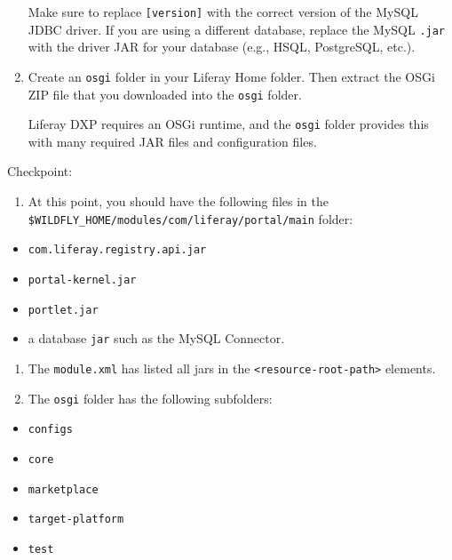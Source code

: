 \begin{enumerate}
  Make sure to replace \texttt{{[}version{]}} with the correct version
  of the MySQL JDBC driver. If you are using a different database,
  replace the MySQL \texttt{.jar} with the driver JAR for your database
  (e.g., HSQL, PostgreSQL, etc.).
\item
  Create an \texttt{osgi} folder in your Liferay Home folder. Then
  extract the OSGi ZIP file that you downloaded into the \texttt{osgi}
  folder.

  Liferay DXP requires an OSGi runtime, and the \texttt{osgi} folder
  provides this with many required JAR files and configuration files.
\end{enumerate}

Checkpoint:

\begin{enumerate}
\def\labelenumi{\arabic{enumi}.}
\tightlist
\item
  At this point, you should have the following files in the
  \texttt{\$WILDFLY\_HOME/modules/com/liferay/portal/main} folder:
\end{enumerate}

\begin{itemize}
\tightlist
\item
  \texttt{com.liferay.registry.api.jar}
\item
  \texttt{portal-kernel.jar}
\item
  \texttt{portlet.jar}
\item
  a database \texttt{jar} such as the MySQL Connector.
\end{itemize}

\begin{enumerate}
\def\labelenumi{\arabic{enumi}.}
\setcounter{enumi}{1}
\item
  The \texttt{module.xml} has listed all jars in the
  \texttt{\textless{}resource-root-path\textgreater{}} elements.
\item
  The \texttt{osgi} folder has the following subfolders:
\end{enumerate}

\begin{itemize}
\tightlist
\item
  \texttt{configs}
\item
  \texttt{core}
\item
  \texttt{marketplace}
\item
  \texttt{target-platform}
\item
  \texttt{test}
\end{itemize}

